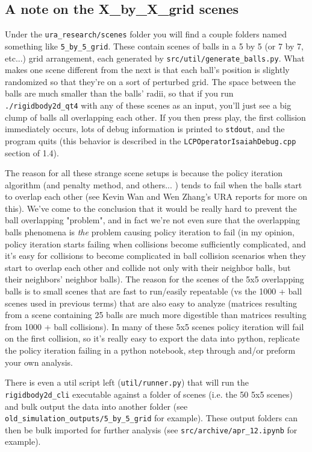 \documentclass[12pt]{article}
\begin{document}
\subsection{A note on the X\_by\_X\_grid scenes}

Under the \texttt{ura\_research/scenes} folder you will find a couple folders named something like \texttt{5\_by\_5\_grid}.
These contain scenes of balls in a 5 by 5 (or 7 by 7, etc...) grid arrangement, each generated by \texttt{src/util/generate\_balls.py}.
What makes one scene different from the next is that each ball's position is slightly randomized
so that they're on a sort of perturbed grid. 
The space between the balls are much smaller than the balls' radii,
so that if you run \texttt{./rigidbody2d\_qt4}
with any of these scenes as an input, you'll just see a big clump of balls all overlapping each other.
If you then press play, the first collision immediately occurs, lots of debug information is printed to \texttt{stdout},
and the program quits (this behavior is described in the \texttt{LCPOperatorIsaiahDebug.cpp} section of 1.4).

The reason for all these strange scene setups is because the policy iteration algorithm (and penalty method, and others... ) tends to fail
when the balls start to overlap each other (see Kevin Wan and Wen Zhang's URA reports for more on this).
We've come to the conclusion that it would be really hard to prevent the ball overlapping "problem",
and in fact we're not even sure that the overlapping balls phenomena is \textit{the} problem causing policy iteration
to fail (in my opinion, policy iteration starts failing when collisions become sufficiently complicated,
and it's easy for collisions to become complicated in ball collision scenarios when they start to
overlap each other and collide not only with their neighbor balls, but their neighbors' neighbor balls).
The reason for the scenes of the 5x5 overlapping balls is to small scenes that are fast to run/easily repeatable
(vs the 1000 + ball scenes used in previous terms) that are also easy to analyze
(matrices resulting from a scene containing 25 balls are much more digestible than matrices resulting from 1000 + ball collisions).
In many of these 5x5 scenes policy iteration will fail on the first collision,
so it's really easy to export the data into python, replicate the policy iteration failing in a python notebook, step through and/or preform your own analysis.

There is even a util script left (\texttt{util/runner.py}) that will run the \texttt{rigidbody2d\_cli}
executable against a folder of scenes (i.e. the 50 5x5 scenes) and bulk output the data into another folder
(see \texttt{old\_simulation\_outputs/5\_by\_5\_grid} for example).
These output folders can then be bulk imported for further analysis
(see \texttt{src/archive/apr\_12.ipynb} for example).
\end{document}
